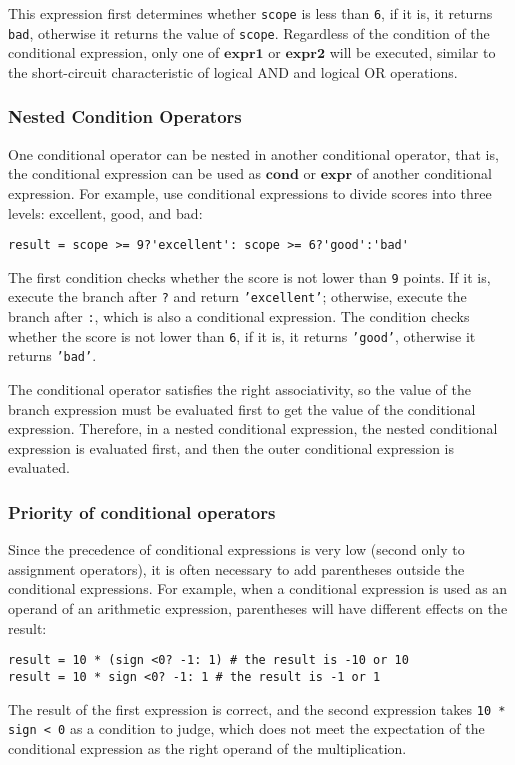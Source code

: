 This expression first determines whether \texttt{scope} is less than \texttt{6}, if it is, it returns \texttt{bad}, otherwise it returns the value of \texttt{scope}. Regardless of the condition of the conditional expression, only one of $\bm{expr1}$ or $\bm{expr2}$ will be executed, similar to the short-circuit characteristic of logical AND and logical OR operations.

\subsubsection {Nested Condition Operators}

One conditional operator can be nested in another conditional operator, that is, the conditional expression can be used as $\bm{cond}$ or $\bm{expr}$ of another conditional expression. For example, use conditional expressions to divide scores into three levels: excellent, good, and bad:
\begin{lstlisting}[language=berry, numbers=none]
result = scope >= 9?'excellent': scope >= 6?'good':'bad'
\end{lstlisting}

The first condition checks whether the score is not lower than \texttt{9} points. If it is, execute the branch after \texttt{?} and return \texttt{'excellent'}; otherwise, execute the branch after \texttt{:}, which is also a conditional expression. The condition checks whether the score is not lower than \texttt{6}, if it is, it returns \texttt{'good'}, otherwise it returns \texttt{'bad'}.

The conditional operator satisfies the right associativity, so the value of the branch expression must be evaluated first to get the value of the conditional expression. Therefore, in a nested conditional expression, the nested conditional expression is evaluated first, and then the outer conditional expression is evaluated.

\subsubsection{Priority of conditional operators}

Since the precedence of conditional expressions is very low (second only to assignment operators), it is often necessary to add parentheses outside the conditional expressions. For example, when a conditional expression is used as an operand of an arithmetic expression, parentheses will have different effects on the result:
\begin{lstlisting}[language=berry, numbers=none]
result = 10 * (sign <0? -1: 1) # the result is -10 or 10
result = 10 * sign <0? -1: 1 # the result is -1 or 1
\end{lstlisting}
The result of the first expression is correct, and the second expression takes \texttt{10 * sign < 0} as a condition to judge, which does not meet the expectation of the conditional expression as the right operand of the multiplication.


